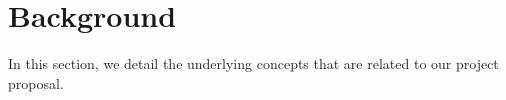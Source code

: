 \section{Background}
\label{sec:background}

In this section, we detail the underlying concepts that are related to our project proposal.







